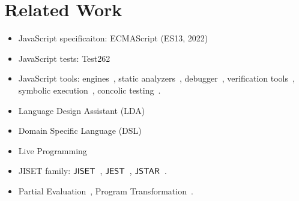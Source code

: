 \section{Related Work}\label{sec:related}

\begin{itemize}
  \item JavaScript specificaiton: ECMAScript (ES13, 2022)~\cite{es13}
  \item JavaScript tests: Test262~\cite{test262}
  \item JavaScript tools: engines~\cite{v8, jscore, chakra, spidermonkey},
    static analyzers~\cite{safe, safe2, tajs, wala, jsai},
    debugger~\cite{jsexplain}, verification tools~\cite{javert, javert2,
    ad-safety, javanni}, symbolic execution~\cite{symbolic-js, sym-js, expo-se},
    concolic testing~\cite{jalangi, type-conc-test}.
  \item Language Design Assistant (LDA)~\cite{lda, lisa, ipld, asf-sdf,
    meta-env, faustine}
  \item Domain Specific Language (DSL)~\cite{dsl-survey, dsl-survey2}
  \item Live Programming~\cite{omnicode, situ-vis, proj-box}
  \item JISET family: $\jiset$~\cite{jiset}, $\jest$~\cite{jest}, $\jstar$~\cite{jstar}.
  \item Partial Evaluation~\cite{peval, peval-survey}, Program
    Transformation~\cite{trans-ai}.
\end{itemize}

\todo
